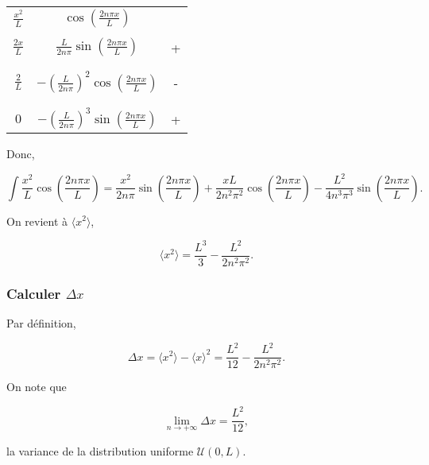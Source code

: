 \documentclass[french]{article}
\begin{document}
{\begin{tcolorbox}[colback=yellow!5!white,colframe=yellow!75!black]
		 \begin{center}
		 	\begin{tabular}[5pt]{c c c}
		 		$\frac{x^2}{L}$ & $\cos\left(\frac{2n\pi x}{L} \right)$  &  \\ \\[-1em]
		 		$\frac{2x}{L}$& $\frac{L}{2n\pi}\sin\left(\frac{2n\pi x}{L} \right)$ &  +\\ \\[-1em]
		 		\\[-1em]
		 		$\frac{2}{L}$& $-\left(\frac{L}{2n\pi}\right)^2\cos\left(\frac{2n\pi x}{L} \right)$ &  -\\ \\[-1em]
		 		\\[-1em]
		 		$0$ & $-\left(\frac{L}{2n\pi}\right)^3\sin\left(\frac{2n\pi x}{L} \right)$  &  +\\ 
		 	\end{tabular}
		 \end{center}
		
		Donc,
		
		\begin{equation}
			\int \frac{x^2}{L}\cos\left(\frac{2n\pi x}{L} \right) = \frac{x^2}{2n\pi}\sin\left(\frac{2n\pi x}{L}\right) + \frac{xL}{2n^2\pi^2}\cos\left(\frac{2n\pi x}{L}\right) - \frac{L^2}{4n^3\pi^3}\sin\left(\frac{2n\pi x}{L}\right).
		\end{equation}
		
	\end{tcolorbox}

	On revient à $\langle x^2 \rangle$,
	
	\begin{equation}
		\langle x^2 \rangle = \frac{L^3}{3} - \frac{L^2}{2n^2\pi^2}.
	\end{equation}
	
	\subsubsection*{Calculer $\Delta x$}
	
	Par définition,
	
	\begin{equation}
		\Delta x = \langle x^2 \rangle - \langle x \rangle^2 = \frac{L^2}{12} - \frac{L^2}{2n^2\pi^2}.
	\end{equation}
	
	On note que
	
	\begin{equation}
		\lim_{n \to +\infty} \Delta x = \frac{L^2}{12},
	\end{equation}
	
	la variance de la distribution uniforme $\mathcal{U}(0, L)$.
	}
\end{document}
